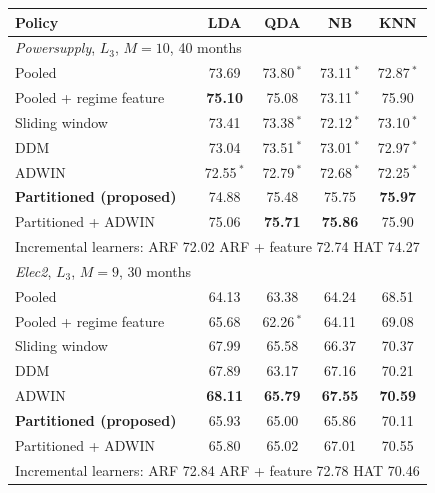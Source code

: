 \begin{tabular}{@{}lcccc@{}}
\toprule
\textbf{Policy} & \textbf{LDA} & \textbf{QDA} & \textbf{NB} & \textbf{KNN}\\
\midrule
\multicolumn{5}{l}{\textit{Powersupply}, $L_3$, $M=10$, 40 months}\\
Pooled & 73.69\phantom{\,$^{*}$} & 73.80\,$^{*}$ & 73.11\,$^{*}$ & 72.87\,$^{*}$\\
Pooled + regime feature & \textbf{75.10}\phantom{\,$^{*}$} & 75.08\phantom{\,$^{*}$} & 73.11\,$^{*}$ & 75.90\phantom{\,$^{*}$}\\
Sliding window & 73.41\phantom{\,$^{*}$} & 73.38\,$^{*}$ & 72.12\,$^{*}$ & 73.10\,$^{*}$\\
DDM & 73.04\phantom{\,$^{*}$} & 73.51\,$^{*}$ & 73.01\,$^{*}$ & 72.97\,$^{*}$\\
ADWIN & 72.55\,$^{*}$ & 72.79\,$^{*}$ & 72.68\,$^{*}$ & 72.25\,$^{*}$\\
\textbf{Partitioned (proposed)} & 74.88\phantom{\,$^{*}$} & 75.48\phantom{\,$^{*}$} & 75.75\phantom{\,$^{*}$} & \textbf{75.97}\phantom{\,$^{*}$}\\
Partitioned + ADWIN & 75.06\phantom{\,$^{*}$} & \textbf{75.71}\phantom{\,$^{*}$} & \textbf{75.86}\phantom{\,$^{*}$} & 75.90\phantom{\,$^{*}$}\\
\multicolumn{5}{l}{Incremental learners: ARF 72.02 \quad ARF + feature 72.74 \quad HAT 74.27}\\
\midrule
\multicolumn{5}{l}{\textit{Elec2}, $L_3$, $M=9$, 30 months}\\
Pooled & 64.13\phantom{\,$^{*}$} & 63.38\phantom{\,$^{*}$} & 64.24\phantom{\,$^{*}$} & 68.51\phantom{\,$^{*}$}\\
Pooled + regime feature & 65.68\phantom{\,$^{*}$} & 62.26\,$^{*}$ & 64.11\phantom{\,$^{*}$} & 69.08\phantom{\,$^{*}$}\\
Sliding window & 67.99\phantom{\,$^{*}$} & 65.58\phantom{\,$^{*}$} & 66.37\phantom{\,$^{*}$} & 70.37\phantom{\,$^{*}$}\\
DDM & 67.89\phantom{\,$^{*}$} & 63.17\phantom{\,$^{*}$} & 67.16\phantom{\,$^{*}$} & 70.21\phantom{\,$^{*}$}\\
ADWIN & \textbf{68.11}\phantom{\,$^{*}$} & \textbf{65.79}\phantom{\,$^{*}$} & \textbf{67.55}\phantom{\,$^{*}$} & \textbf{70.59}\phantom{\,$^{*}$}\\
\textbf{Partitioned (proposed)} & 65.93\phantom{\,$^{*}$} & 65.00\phantom{\,$^{*}$} & 65.86\phantom{\,$^{*}$} & 70.11\phantom{\,$^{*}$}\\
Partitioned + ADWIN & 65.80\phantom{\,$^{*}$} & 65.02\phantom{\,$^{*}$} & 67.01\phantom{\,$^{*}$} & 70.55\phantom{\,$^{*}$}\\
\multicolumn{5}{l}{Incremental learners: ARF 72.84 \quad ARF + feature 72.78 \quad HAT 70.46}\\
\bottomrule
\end{tabular}
